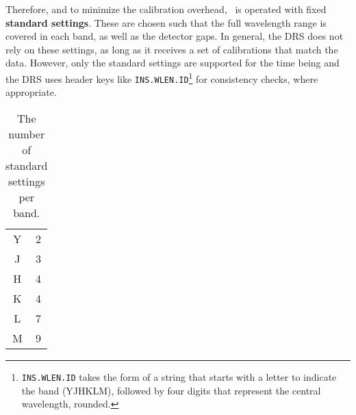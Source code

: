 Therefore, and to minimize the calibration overhead, \instrument\ is operated
with fixed \textbf{standard settings}. These are chosen such that the full
wavelength range is covered in each band, as well as the detector gaps. In
general, the DRS does not rely on these settings, as long as it receives a set
of calibrations that match the data. However, only the standard settings are
supported for the time being and the DRS uses header keys like
\texttt{INS.WLEN.ID}\footnote{\texttt{INS.WLEN.ID} takes the form of a string
that starts with a letter to indicate the band (YJHKLM), followed by four digits
that represent the central wavelength, rounded.} for consistency checks, where
appropriate.


\begin{table}[htbp]
  \centering\begin{tabular}{cc}
  Y  & 2\\
  J  & 3\\
  H  & 4\\
  K  & 4\\
  L  & 7\\
  M  & 9\\
  \end{tabular}
  \caption{The number of standard settings per band.}
  \label{tab:nsettings}
\end{table}
